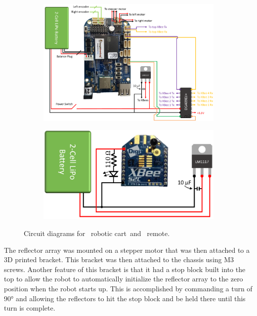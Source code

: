 \documentclass[conference]{IEEEtran}
\begin{document}
\begin{figure}[htbp]
  \centering
  \begin{subfigure}[b]{0.47\linewidth}
    \centering
    \includegraphics[width=\textwidth]{figs/robotCircuit.pdf}
    \caption{}
    \label{fig:robotCircuit}
  \end{subfigure}
  \begin{subfigure}[b]{0.47\linewidth}
    \centering
    \includegraphics[width=\textwidth]{figs/remoteCircuit.pdf}
    \caption{}
    \label{fig:remoteCircuit}
  \end{subfigure}
    \caption{Circuit diagrams for~ robotic cart~and~ remote.}
    \label{fig:CktDiagramRoboticCartRemote}
\end{figure}
%
The reflector array  was mounted on a stepper motor that was then attached to a 3D printed bracket. This bracket was then attached to the chassis using M3 screws. Another feature of this bracket is that it had a stop block built into the top  to allow the robot to automatically initialize the reflector array to the zero position when the robot starts up. This is accomplished by commanding a turn of \ang{90} and allowing the reflectors to hit the stop block and be held there until this turn is complete. %
\end{document}
